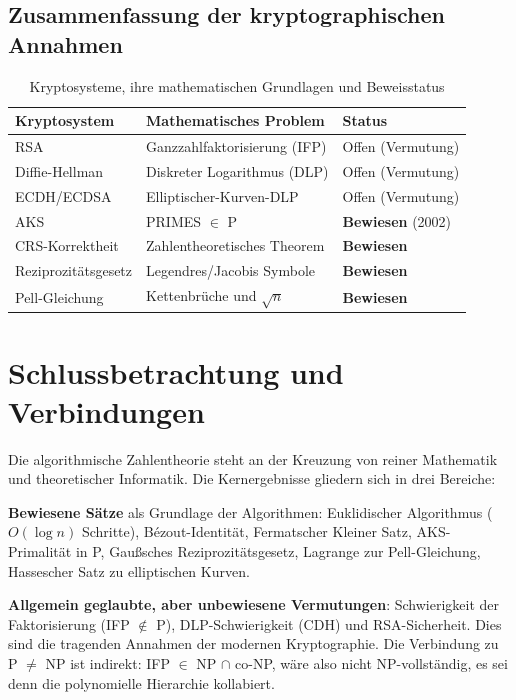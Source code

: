 \documentclass[12pt,a4paper]{amsart}
\theoremstyle{definition}
\begin{document}
\subsection{Zusammenfassung der kryptographischen Annahmen}

\begin{table}[h]
\centering
\begin{tabular}{lll}
\toprule
\textbf{Kryptosystem} & \textbf{Mathematisches Problem} & \textbf{Status} \\
\midrule
RSA & Ganzzahlfaktorisierung (IFP) & Offen (Vermutung) \\
Diffie-Hellman & Diskreter Logarithmus (DLP) & Offen (Vermutung) \\
ECDH/ECDSA & Elliptischer-Kurven-DLP & Offen (Vermutung) \\
AKS & PRIMES $\in$ P & \textbf{Bewiesen} (2002) \\
CRS-Korrektheit & Zahlentheoretisches Theorem & \textbf{Bewiesen} \\
Reziprozitätsgesetz & Legendres/Jacobis Symbole & \textbf{Bewiesen} \\
Pell-Gleichung & Kettenbrüche und $\sqrt{n}$ & \textbf{Bewiesen} \\
\bottomrule
\end{tabular}
\caption{Kryptosysteme, ihre mathematischen Grundlagen und Beweisstatus}
\end{table}

\section{Schlussbetrachtung und Verbindungen}

Die algorithmische Zahlentheorie steht an der Kreuzung von reiner Mathematik
und theoretischer Informatik. Die Kernergebnisse gliedern sich in drei Bereiche:

\medskip
\noindent\textbf{Bewiesene Sätze} als Grundlage der Algorithmen:
Euklidischer Algorithmus ($O(\log n)$ Schritte), Bézout-Identität, Fermatscher
Kleiner Satz, AKS-Primalität in P, Gaußsches Reziprozitätsgesetz, Lagrange zur
Pell-Gleichung, Hassescher Satz zu elliptischen Kurven.

\medskip
\noindent\textbf{Allgemein geglaubte, aber unbewiesene Vermutungen}:
Schwierigkeit der Faktorisierung (IFP $\notin$ P), DLP-Schwierigkeit (CDH)
und RSA-Sicherheit. Dies sind die tragenden Annahmen der modernen Kryptographie.
Die Verbindung zu P $\ne$ NP ist indirekt: IFP $\in$ NP $\cap$ co-NP, wäre also
nicht NP-vollständig, es sei denn die polynomielle Hierarchie kollabiert.
\end{document}
